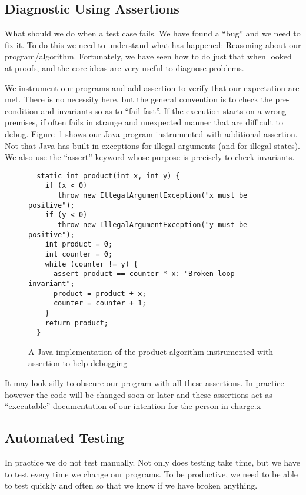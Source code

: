\documentclass{aldast}
\begin{document}
\subsection{Diagnostic Using Assertions}
What should we do when a test case fails. We have found a ``bug'' and
we need to fix it. To do this we need to understand what has happened:
Reasoning about our program/algorithm. Fortunately, we have seen how
to do just that when looked at proofs, and the core ideas are very
useful to diagnose problems.

We instrument our programs and add assertion to verify that our
expectation are met. There is no necessity here, but the general
convention is to check the pre-condition and invariants so as to
``fail fast''. If the execution starts on a wrong premises, if often
fails in strange and unexpected manner that are difficult to
debug. Figure~\ref{fig:assertion} shows our Java program instrumented
with additional assertion. Not that Java has built-in exceptions for
illegal arguments (and for illegal states). We also use the ``assert''
keyword whose purpose is precisely to check invariants.

\begin{figure}[htbp]
\begin{verbatim}
  static int product(int x, int y) {
    if (x < 0)
       throw new IllegalArgumentException("x must be positive");
    if (y < 0)
       throw new IllegalArgumentException("y must be positive");
    int product = 0;
    int counter = 0;
    while (counter != y) {
      assert product == counter * x: "Broken loop invariant";
      product = product + x;
      counter = counter + 1;
    }
    return product;
  }
  \end{verbatim}
  \caption{A Java implementation of the product algorithm instrumented
    with assertion to help debugging}
  \label{fig:assertion}
\end{figure}

It may look silly to obscure our program with all these
assertions. In practice however the code will be changed soon or later
and these assertions act as ``executable'' documentation of our
intention for the person in charge.x

\subsection{Automated Testing}
In practice we do not test manually. Not only does testing take time,
but we have to test every time we change our programs. To be
productive, we need to be able to test quickly and often so that we
know if we have broken anything.
\end{document}

